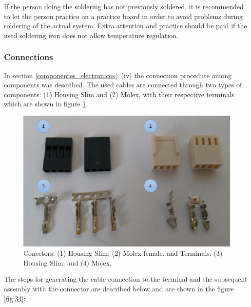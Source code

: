 \documentclass[12pt,letterpaper]{article}
\numberwithin{figure}{section}
\numberwithin{equation}{section}
\numberwithin{table}{section}
\begin{document}
If the person doing the soldering has not previously soldered, it is recommended to let the person practice on a practice board in order to avoid problems during soldering of the actual system. Extra attention and practice should be paid if the used soldering iron does not allow temperature regulation.

\subsubsection{Connections}

In section \ref{componentes_electronicos}, (iv) the connection procedure among components was described. The used cables are connected through two types of components: (1) Housing Slim and (2) Molex, with their respective terminals which are shown in figure \ref{fig:33}.

\begin{figure}[H]
    \centering
    \includegraphics[scale=0.45]{Figuras/figure_33.jpg}
    \caption{Conectors: (1) Housing Slim; (2) Molex female, and Terminals: (3) Housing Slim; and (4) Molex.}
    \label{fig:33}
\end{figure}


The steps for generating the cable connection to the terminal and the subsequent assembly with the connector are described below and are shown in the figure \ref{fig:34}:
\end{document}
